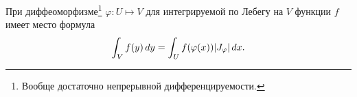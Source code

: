 \begin{to_con}
\label{con_6.109}
     При диффеоморфизме\footnote{
         Вообще достаточно непрерывной дифференцируемости.
     } $\varphi \colon U \mapsto  V$ для интегрируемой по Лебегу на $V$ функции $f$ имеет место формула
\begin{equation*}
    \int_V f(y) \, d y = \int_U f(\varphi(x)) |J_\varphi| \, d x.
\end{equation*}
\end{to_con}



